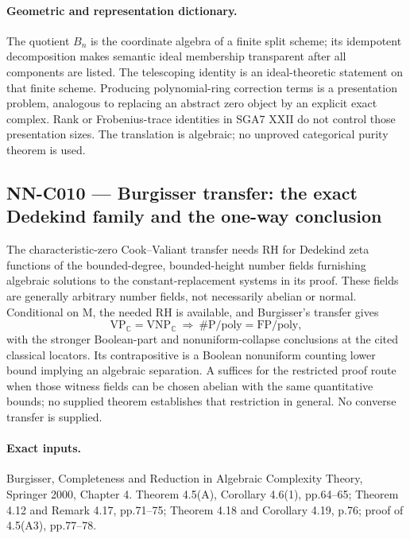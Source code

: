 \paragraph{Geometric and representation dictionary.}
The quotient $B_n$ is the coordinate algebra of a finite split scheme; its idempotent decomposition makes semantic ideal membership transparent after all components are listed. The telescoping identity is an ideal-theoretic statement on that finite scheme. Producing polynomial-ring correction terms is a presentation problem, analogous to replacing an abstract zero object by an explicit exact complex. Rank or Frobenius-trace identities in SGA7 XXII do not control those presentation sizes. The translation is algebraic; no unproved categorical purity theorem is used.

\subsection{NN-C010 --- Burgisser transfer: the exact Dedekind family and the one-way conclusion}
\begin{proposition}[NN-C010]
The characteristic-zero Cook--Valiant transfer needs RH for Dedekind zeta functions of the bounded-degree, bounded-height number fields furnishing algebraic solutions to the constant-replacement systems in its proof. These fields are generally arbitrary number fields, not necessarily abelian or normal. Conditional on M, the needed RH is available, and Burgisser's transfer gives
\[
 \mathrm{VP}_{\mathbb C}=\mathrm{VNP}_{\mathbb C}
 \ \Longrightarrow\ \#\mathrm P/\mathrm{poly}=\mathrm{FP}/\mathrm{poly},
\]
with the stronger Boolean-part and nonuniform-collapse conclusions at the cited classical locators. Its contrapositive is a Boolean nonuniform counting lower bound implying an algebraic separation. A suffices for the restricted proof route when those witness fields can be chosen abelian with the same quantitative bounds; no supplied theorem establishes that restriction in general. No converse transfer is supplied.
\end{proposition}
\paragraph{Exact inputs.}
Burgisser, Completeness and Reduction in Algebraic Complexity Theory, Springer 2000, Chapter 4. Theorem 4.5(A), Corollary 4.6(1), pp.64--65; Theorem 4.12 and Remark 4.17, pp.71--75; Theorem 4.18 and Corollary 4.19, p.76; proof of 4.5(A3), pp.77--78.

